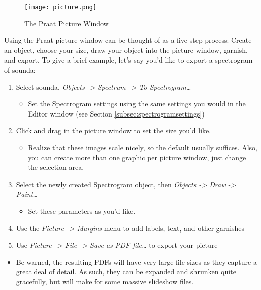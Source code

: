 \documentclass[11pt]{article}
\def\tightlist{}
\begin{document}
\begin{figure}
  \centerline{
    \mbox{\texttt{[image: picture.png]}}
  }
  \caption{The Praat Picture Window \label{picture}}
  
  \end{figure}

Using the Praat picture window can be thought of as a five step process:
Create an object, choose your size, draw your object into the picture
window, garnish, and export. To give a brief example, let's say you'd
like to export a spectrogram of sounda:

\begin{enumerate}
\def\labelenumi{\arabic{enumi}.}
\tightlist
\item
  Select sounda, \emph{Objects -\textgreater{} Spectrum -\textgreater{}
  To Spectrogram\ldots{}}

  \begin{itemize}
  \tightlist
  \item
    Set the Spectrogram settings using the same settings you would in
    the Editor window (see Section \ref{subsec:spectrogramsettings})
  \end{itemize}
\item
  Click and drag in the picture window to set the size you'd like.

  \begin{itemize}
  \tightlist
  \item
    Realize that these images scale nicely, so the default usually
    suffices. Also, you can create more than one graphic per picture
    window, just change the selection area.
  \end{itemize}
\item
  Select the newly created Spectrogram object, then \emph{Objects
  -\textgreater{} Draw -\textgreater{} Paint\ldots{}}

  \begin{itemize}
  \tightlist
  \item
    Set these parameters as you'd like.
  \end{itemize}
\item
  Use the \emph{Picture -\textgreater{} Margins} menu to add labels,
  text, and other garnishes
\item
  Use \emph{Picture -\textgreater{} File -\textgreater{} Save as PDF
  file\ldots{}} to export your picture
\end{enumerate}

\begin{itemize}
\tightlist
\item
  Be warned, the resulting PDFs will have very large file sizes as they
  capture a great deal of detail. As such, they can be expanded and
  shrunken quite gracefully, but will make for some massive slideshow
  files.
\end{itemize}
\end{document}
